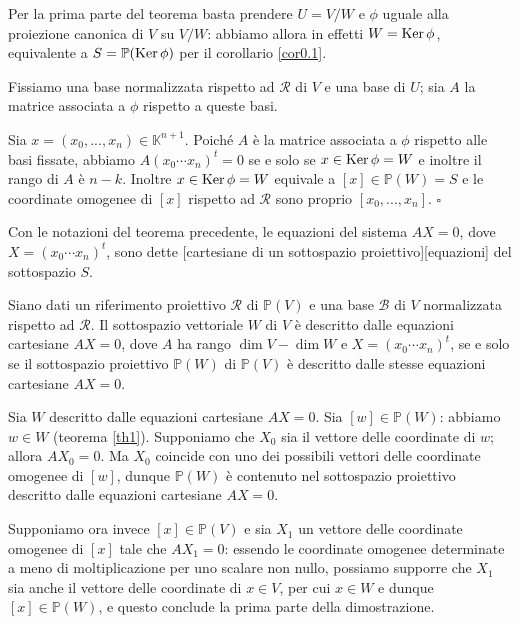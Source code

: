 \Proof Per la prima parte del teorema basta prendere $U = V/W$ e $\phi$ uguale alla proiezione canonica di $V$ su $V/W$: abbiamo allora in effetti $W = \operatorname{Ker} \phi$, equivalente a $S = \mathbb{P}(\operatorname{Ker} \phi)$ per il corollario \ref{cor0.1}.
	\par Fissiamo una base normalizzata rispetto ad $\mathcal{R}$ di $V$ e una base di $U$; sia $A$ la matrice associata a $\phi$ rispetto a queste basi.
	\par Sia $x = (x_0, ..., x_n) \in \mathbb{K}^{n+ 1}$. Poich\'e $A$ \`e la matrice associata a $\phi$ rispetto alle basi fissate, abbiamo $A (x_0 \cdots x_n)^t = 0$ se e solo se $x \in \operatorname{Ker} \phi = W$ e inoltre il rango di $A$ \`e $n - k$. Inoltre $x \in \operatorname{Ker} \phi = W$ equivale a $[x] \in \mathbb{P}(W) = S$ e le coordinate omogenee di $[x]$ rispetto ad $\mathcal{R}$ sono proprio $[x_0, ..., x_n]$. $\square$
\begin{Definition}\label{def22}
	Con le notazioni del teorema precedente, le equazioni del sistema $AX = 0$, dove $X = (x_0 \cdots x_n)^t$, sono dette [cartesiane di un sottospazio proiettivo][equazioni] del sottospazio $S$.
\end{Definition}
\begin{Theorem}\label{th22}
	Siano dati un riferimento proiettivo $\mathcal{R}$ di $\mathbb{P}(V)$ e una base $\mathcal{B}$ di $V$ normalizzata rispetto ad $\mathcal{R}$. Il sottospazio vettoriale $W$ di $V$ \`e descritto dalle equazioni cartesiane $AX = 0$, dove $A$ ha rango $\dim V - \dim W$ e $X = (x_0 \cdots x_n)^t$, se e solo se il sottospazio proiettivo $\mathbb{P}(W)$ di $\mathbb{P}(V)$ \`e descritto dalle stesse equazioni cartesiane $AX = 0$.
\end{Theorem}
\Proof Sia $W$ descritto dalle equazioni cartesiane $AX = 0$. Sia $[w] \in \mathbb{P}(W)$: abbiamo $w \in W$ (teorema \ref{th1}). Supponiamo che $X_0$ sia il vettore delle coordinate di $w$; allora $AX_0 = 0$. Ma $X_0$ coincide con uno dei possibili vettori delle coordinate omogenee di $[w]$, dunque $\mathbb{P}(W)$ \`e contenuto nel sottospazio proiettivo descritto dalle equazioni cartesiane $AX = 0$.
	\par Supponiamo ora invece $[x] \in \mathbb{P}(V)$ e sia $X_1$ un vettore delle coordinate omogenee di $[x]$ tale che $AX_1 = 0$: essendo le coordinate omogenee determinate a meno di moltiplicazione per uno scalare non nullo, possiamo supporre che $X_1$ sia anche il vettore delle coordinate di $x \in V$, per cui $x \in W$ e dunque $[x] \in \mathbb{P}(W)$, e questo conclude la prima parte della dimostrazione.
